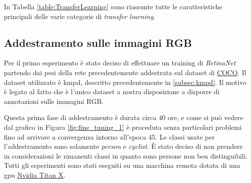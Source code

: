 In Tabella \ref{table:TransferLearning} sono riassunte tutte le caratteristiche principali delle varie categorie di \textit{transfer learning}.
\begin{table}[]
    \centering
    \caption{Schema riassuntivo delle categorie di Transfer Learning}
    \label{table:TransferLearning}
\end{table}
\subsection{Addestramento sulle immagini RGB}
\label{subsec:first_training_rgb_kaist}
Per il primo esperimento è stato deciso di effettuare un training di \textit{RetinaNet} partendo dai pesi della rete precedentemente addestrata sul dataset di \href{http://cocodataset.org/}{COCO}. Il dataset utilizzato è \ac{kmpd}, descritto precedentemente in \ref{subsec:kmpd}. Il motivo è legato al fatto che è l'unico dataset a nostra disposizione a disporre di annotazioni sulle immagini RGB.

Questa prima fase di addestramento è durata circa $40$ ore, e come si può vedere dal grafico in Figura \ref{fig:fine_tuning_1} è proceduta senza particolari problemi fino ad arrivare a convergenza intorno all'epoca 45. Le classi usate per l'addestramento sono solamente \textit{person} e \textit{cyclist}. È stato deciso di non prendere in considerazioni le rimanenti classi in quanto sono persone non ben distinguibili. Tutti gli esperimenti sono stati eseguiti su una macchina remota dotata di una \ac{gpu} \href{https://www.geforce.com/hardware/desktop-gpus/geforce-gtx-titan-x}{Nvidia Titan X}.

